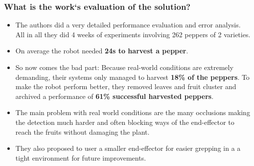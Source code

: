     \subsubsection*{What is the work`s evaluation of the solution?}
    \begin{itemize}
        \item The authors did a very detailed performance evaluation and error analysis. All in all they did 4 weeks of experiments involving 262 peppers of 2 varieties.
        \item On average the robot needed \textbf{24s to harvest a pepper}.
        \item So now comes the bad part: Because real-world conditions are extremely demanding, their systems only managed to
        harvest \textbf{18\% of the peppers}. To make the robot perform better, they removed leaves and fruit cluster and archived 
        a performance of \textbf{61\% successful harvested peppers}.
        \item The main problem with real world conditions are the many occlusions making the detection much harder and often 
        blocking ways of the end-effector to reach the fruits without damaging the plant.
        \item They also proposed to user a smaller end-effector for easier grepping in a a tight environment for future improvements.
    \end{itemize}
